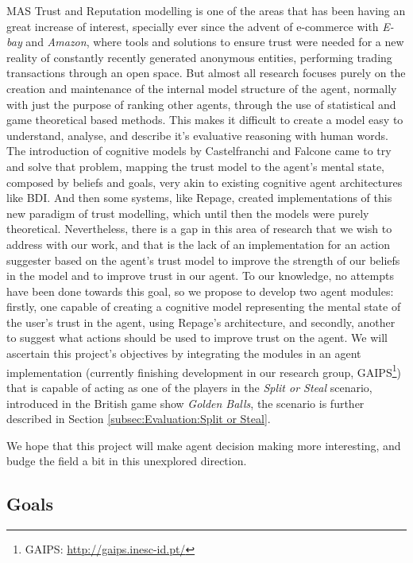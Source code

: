 \ac{MAS} Trust and Reputation modelling is one of the areas that has been having an great increase of interest, specially ever since the advent of e-commerce\cite{Granatyr2015} with \textit{E-bay} and \textit{Amazon}, where tools and solutions to ensure trust were needed for a new reality of constantly recently generated anonymous entities, performing trading transactions through an open space. But almost all research focuses purely on the creation and maintenance of the internal model structure of the agent, normally with just the purpose of ranking other agents, through the use of statistical and game theoretical based methods. This makes it difficult to create a model easy to understand, analyse, and describe it's evaluative reasoning with human words. The introduction of cognitive models by Castelfranchi and Falcone \cite{Castelfranchi1998} came to try and solve that problem, mapping the trust model to the agent's mental state, composed by beliefs and goals, very akin to existing cognitive agent architectures like BDI\cite{Rao1995}. And then some systems, like Repage\cite{Sabater2006}, created implementations of this new paradigm of trust modelling, which until then the models were purely theoretical. Nevertheless, there is a gap in this area of research that we wish to address with our work, and that is the lack of an implementation for an action suggester based on the agent's trust model to improve the strength of our beliefs in the model and to improve trust in our agent. To our knowledge, no attempts have been done towards this goal, so we propose to develop two agent modules: firstly, one capable of creating a cognitive model representing the mental state of the user's trust in the agent, using Repage's architecture, and secondly, another to suggest what actions should be used to improve trust on the agent. We will ascertain this project's objectives by integrating the modules in an agent implementation (currently finishing development in our research group, \acs{GAIPS}\footnote{\ac{GAIPS}: \url{http://gaips.inesc-id.pt/}}) that is capable of acting as one of the players in the \textit{Split or Steal} scenario, introduced in the British game show \textit{Golden Balls}\cite{Wikipedia.Golden.Balls}, the scenario is further described in Section \ref{subsec:Evaluation:Split or Steal}.

We hope that this project will make agent decision making more interesting, and budge the field a bit in this unexplored direction.


\subsection{Goals}
\label{subsec:Goals}

